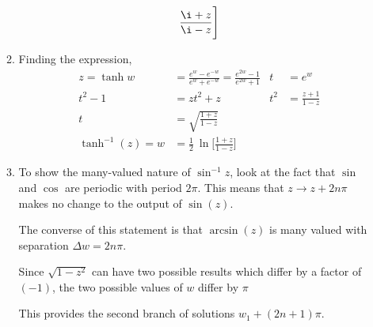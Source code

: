 \begin{enumerate}
\begin{enumerate}
\begin{align}
                            \frac{\i + z}{\i - z}\Bigg]
                    \end{align}
              \item Finding the expression,
                    \begin{align}
                        z = \tanh w       & =
                        \frac{e^{w} - e^{-w}}{e^{w} + e^{-w}}
                        = \frac{e^{2w} - 1}
                        {e^{2w} + 1}      &
                        t                 & = e^{w}                        \\
                        t^2 - 1           & = zt^2 + z                   &
                        t^2               & = \frac{z + 1}{1 - z}          \\
                        t                 & = \sqrt{\frac{1 + z}{1 - z}}   \\
                        \tanh^{-1}(z) = w & = \frac{1}{2}\ \ln\Bigg[
                            \frac{1 + z}{1 - z}\Bigg]
                    \end{align}

              \item To show the many-valued nature of $ \sin^{-1} z $, look at the
                    fact that $ \sin $ and $ \cos $ are periodic with period $ 2\pi $.
                    This means that $ z \to z + 2n\pi $ makes no change to the
                    output of $ \sin(z) $. \par
                    The converse of this statement is that $ \arcsin(z) $ is many valued
                    with separation $ \Delta w  = 2n\pi$. \par
                    Since $ \sqrt{1 - z^2} $ can have two possible results which differ
                    by a factor of $ (-1) $, the two possible values of $ w $ differ by
                    $ \pi $ \par
                    This provides the second branch of solutions $ w_1 + (2n+1)\pi $.
          \end{enumerate}
\end{enumerate}